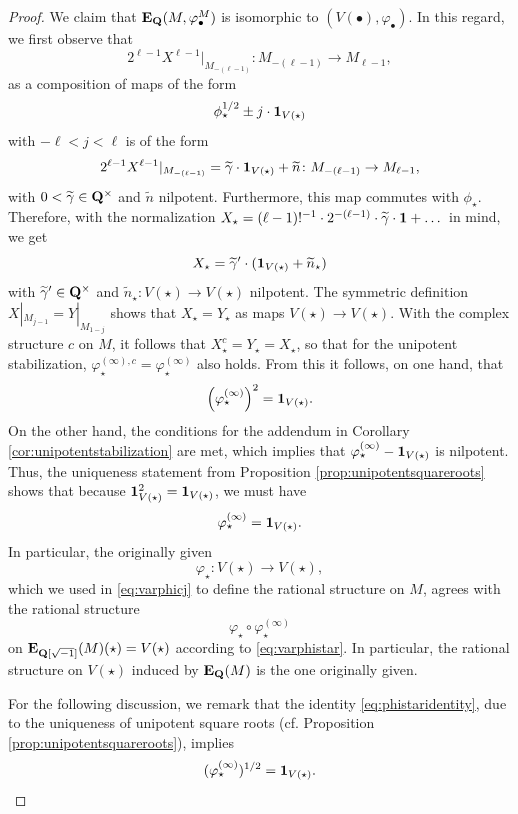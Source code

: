 \documentclass[a4paper,12pt,reqno]{amsart}
\newcommand{\QQ}{{\rm\bf Q}}
\newcommand{\EE}{{\rm\bf E}}
\theoremstyle{plain}
\theoremstyle{remark}
\begin{document}
\begin{proof}
    \smallskip
    We claim that $\EE_{\QQ}(M,\varphi_\bullet^M)$ is isomorphic to $(V(\bullet),\varphi_\bullet)$. In this regard, we first observe that
    \[
    2^{\ell-1}X^{\ell-1}|_{M_{-(\ell-1)}}\colon M_{-(\ell-1)}\to M_{\ell-1},
    \]
    as a composition of maps of the form
    \[
    \phi_\star^{1/2}\pm j\cdot{\bf1}_{V(\star)}
    \]
    with $-\ell < j < \ell$ is of the form
    \[
    2^{\ell-1}X^{\ell-1}|_{M_{-(\ell-1)}}=\widetilde{\gamma}\cdot{\bf1}_{V(\star)}+\widetilde{n}\colon M_{-(\ell-1)}\to M_{\ell-1},
    \]
    with $0<\widetilde{\gamma}\in\QQ^\times$ and $\widetilde{n}$ nilpotent. Furthermore, this map commutes with $\phi_\star$.
    Therefore, with the normalization $X_\star = (\ell-1)!^{-1} \cdot 2^{-(\ell-1)} \cdot \widetilde{\gamma} \cdot {\bf 1} + \dots$ in mind, we get
    \[
    X_\star=\widetilde{\gamma}' \cdot( {\bf1}_{V(\star)}+\widetilde{n}_\star )
    \]
    with $\widetilde{\gamma}' \in \QQ^\times$ and $\widetilde{n}_\star\colon V(\star)\to V(\star)$ nilpotent.
    The symmetric definition $X|_{M_{j-1}} = Y|_{M_{1-j}}$ shows that $X_\star=Y_\star$ as maps $V(\star)\to V(\star)$. With the complex structure $c$ on $M$, it follows that $X_\star^c=Y_\star=X_\star$, so that for the unipotent stabilization, $\varphi_\star^{(\infty),c}=\varphi_\star^{(\infty)}$ also holds. From this it follows, on one hand, that
    \[
    \left(\varphi_\star^{(\infty)}\right)^2={\bf1}_{V(\star)}.
    \]
    On the other hand, the conditions for the addendum in Corollary \ref{cor:unipotentstabilization} are met, which implies that $\varphi_\star^{(\infty)}-{\bf1}_{V(\star)}$ is nilpotent. Thus, the uniqueness statement from Proposition \ref{prop:unipotentsquareroots} shows that because ${\bf1}_{V(\star)}^2={\bf1}_{V(\star)}$, we must have
    \begin{equation}
      \varphi_\star^{(\infty)}={\bf1}_{V(\star)}.
      \label{eq:phistaridentity}
    \end{equation}
    In particular, the originally given
    \[
    \varphi_\star\colon V(\star)\to V(\star),
    \]
    which we used in \eqref{eq:varphicj} to define the rational structure on $M$, agrees with the rational structure
    \[
    \varphi_\star\circ\varphi_\star^{(\infty)}
    \]
    on $\EE_{\QQ[\sqrt{-1}]}(M)(\star)=V(\star)$ according to \eqref{eq:varphistar}. In particular, the rational structure on $V(\star)$ induced by $\EE_\QQ(M)$ is the one originally given.

    For the following discussion, we remark that the identity \eqref{eq:phistaridentity}, due to the uniqueness of unipotent square roots (cf. Proposition \ref{prop:unipotentsquareroots}), implies
    \begin{equation}
      (\varphi_{\star}^{(\infty)})^{1/2}={\bf1}_{V(\star)}.
      \label{eq:starsquarerootsinverses}
    \end{equation}
    

\end{proof}
\end{document}
